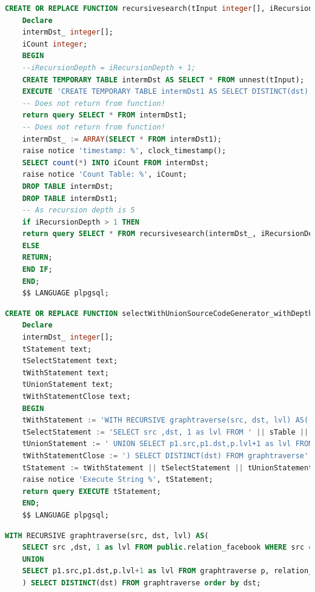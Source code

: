 \newpage
\begin{lstlisting}[language=SQL,caption = Selbstgeschriebenes Stored Procedure,frame=single, label={2.recursiveFunction.listing} ]
    CREATE OR REPLACE FUNCTION recursivesearch(tInput integer[], iRecursionDepth integer, sTable text) RETURNS SETOF integer AS $$
    Declare
    intermDst_ integer[];
    iCount integer;
    BEGIN
    --iRecursionDepth = iRecursionDepth + 1;
    CREATE TEMPORARY TABLE intermDst AS SELECT * FROM unnest(tInput);
    EXECUTE 'CREATE TEMPORARY TABLE intermDst1 AS SELECT DISTINCT(dst) FROM ' || sTable || ' WHERE src IN (SELECT * FROM intermDst)';
    -- Does not return from function!
    return query SELECT * FROM intermDst1;
    -- Does not return from function!
    intermDst_ := ARRAY(SELECT * FROM intermDst1);
    raise notice 'timestamp: %', clock_timestamp();
    SELECT count(*) INTO iCount FROM intermDst;
    raise notice 'Count Table: %', iCount;
    DROP TABLE intermDst;
    DROP TABLE intermDst1;
    -- As recursion depth is 5
    if iRecursionDepth > 1 THEN
    return query SELECT * FROM recursivesearch(intermDst_, iRecursionDepth - 1, sTable);
    ELSE
    RETURN;
    END IF;
    END;
    $$ LANGUAGE plpgsql;
\end{lstlisting}

\begin{lstlisting}[language=SQL,caption = SQL Standard Generisch,frame=single, label={2.StandardSQLGenerisch.listing} ]
    CREATE OR REPLACE FUNCTION selectWithUnionSourceCodeGenerator_withDepth(sTable text, startingNode integer, depth integer ) RETURNS SETOF integer AS $$
    Declare
    intermDst_ integer[];
    tStatement text;
    tSelectStatement text;
    tWithStatement text;
    tUnionStatement text;
    tWithStatementClose text;
    BEGIN
    tWithStatement := 'WITH RECURSIVE graphtraverse(src, dst, lvl) AS(';
    tSelectStatement := 'SELECT src ,dst, 1 as lvl FROM ' || sTable || ' WHERE src ='||startingNode;
    tUnionStatement := ' UNION SELECT p1.src,p1.dst,p.lvl+1 as lvl FROM graphtraverse p, ' || sTable || ' p1 WHERE p1.src IN ( p.dst ) and lvl<'||depth;
    tWithStatementClose := ') SELECT DISTINCT(dst) FROM graphtraverse';
    tStatement := tWithStatement || tSelectStatement || tUnionStatement || tWithStatementClose;
    raise notice 'Execute String %', tStatement;
    return query EXECUTE tStatement;
    END;
    $$ LANGUAGE plpgsql;
\end{lstlisting}

\begin{lstlisting}[language=SQL,caption = SQL Standard,frame=single, label={2.StandardSQL.listing} ]
    WITH RECURSIVE graphtraverse(src, dst, lvl) AS(
    SELECT src ,dst, 1 as lvl FROM public.relation_facebook WHERE src =765
    UNION
    SELECT p1.src,p1.dst,p.lvl+1 as lvl FROM graphtraverse p, relation_facebook p1 WHERE p1.src IN ( p.dst ) and lvl<5
    ) SELECT DISTINCT(dst) FROM graphtraverse order by dst;
\end{lstlisting}


